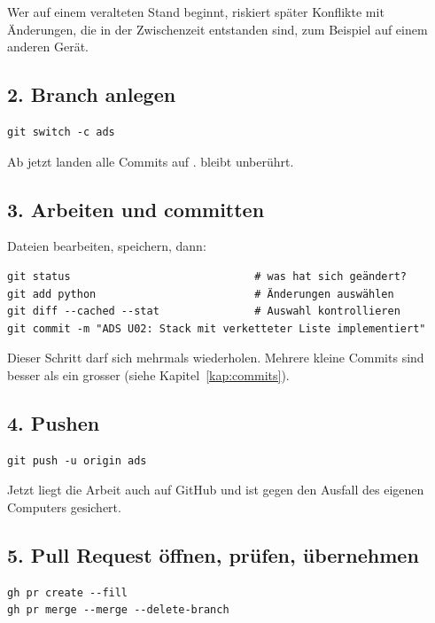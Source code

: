 Wer auf einem veralteten Stand beginnt, riskiert später Konflikte mit Änderungen, die in
der Zwischenzeit entstanden sind, zum Beispiel auf einem anderen Gerät.

\subsection*{2. Branch anlegen}

\begin{lstlisting}[style=befehle]
git switch -c ads
\end{lstlisting}

Ab jetzt landen alle Commits auf .  bleibt unberührt.

\subsection*{3. Arbeiten und committen}

Dateien bearbeiten, speichern, dann:

\begin{lstlisting}[style=befehle]
git status                             # was hat sich geändert?
git add python                         # Änderungen auswählen
git diff --cached --stat               # Auswahl kontrollieren
git commit -m "ADS U02: Stack mit verketteter Liste implementiert"
\end{lstlisting}

Dieser Schritt darf sich mehrmals wiederholen. Mehrere kleine Commits sind besser als ein
grosser (siehe Kapitel~\ref{kap:commits}).

\subsection*{4. Pushen}

\begin{lstlisting}[style=befehle]
git push -u origin ads
\end{lstlisting}

Jetzt liegt die Arbeit auch auf GitHub und ist gegen den Ausfall des eigenen Computers gesichert.

\subsection*{5. Pull Request öffnen, prüfen, übernehmen}

\begin{lstlisting}[style=befehle]
gh pr create --fill
gh pr merge --merge --delete-branch
\end{lstlisting}


